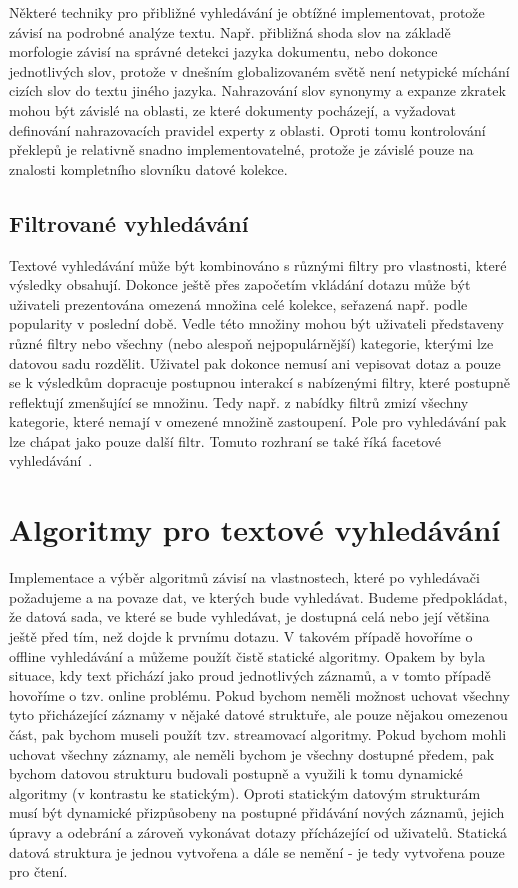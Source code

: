 \documentclass[11pt,letterpaper,oneside,openright]{book}
\begin{document}
Některé techniky pro přibližné vyhledávání je obtížné implementovat, protože
závisí na podrobné analýze textu. Např. přibližná shoda slov na základě
morfologie závisí na správné detekci jazyka dokumentu, nebo dokonce
jednotlivých slov, protože v dnešním globalizovaném světě není netypické
míchání cizích slov do textu jiného jazyka.  Nahrazování slov synonymy a
expanze zkratek mohou být závislé na oblasti, ze které dokumenty pocházejí, a
vyžadovat definování nahrazovacích pravidel experty z oblasti. Oproti tomu
kontrolování překlepů je relativně snadno implementovatelné, protože je závislé
pouze na znalosti kompletního slovníku datové kolekce.

\subsection{Filtrované vyhledávání} \label{sec:faceted_search}
Textové vyhledávání může být kombinováno s různými filtry pro vlastnosti, které
výsledky obsahují. Dokonce ještě přes započetím vkládání dotazu může být
uživateli prezentována omezená množina celé kolekce, seřazená např. podle
popularity v poslední době. Vedle této množiny mohou být uživateli představeny
různé filtry nebo všechny (nebo alespoň nejpopulárnější) kategorie, kterými lze
datovou sadu rozdělit. Uživatel pak dokonce nemusí ani vepisovat dotaz a pouze
se k výsledkům dopracuje postupnou interakcí s nabízenými filtry, které
postupně reflektují zmenšující se množinu. Tedy např. z nabídky filtrů zmizí
všechny kategorie, které nemají v omezené množině zastoupení. Pole pro
vyhledávání pak lze chápat jako pouze další filtr. Tomuto rozhraní se také říká
facetové vyhledávání~\cite{tunkelang2009faceted}.


\newpage
\section{Algoritmy pro textové vyhledávání}
Implementace a výběr algoritmů závisí na vlastnostech, které po vyhledávači
požadujeme a na povaze dat, ve kterých bude vyhledávat. Budeme předpokládat, že
datová sada, ve které se bude vyhledávat, je dostupná celá nebo její většina
ještě před tím, než dojde k prvnímu dotazu. V takovém případě hovoříme o
offline vyhledávání a můžeme použít čistě statické algoritmy.  Opakem by byla
situace, kdy text přichází jako proud jednotlivých záznamů, a v tomto případě
hovoříme o tzv. online problému. Pokud bychom neměli možnost uchovat všechny
tyto přicházející záznamy v nějaké datové struktuře, ale pouze nějakou omezenou
část, pak bychom museli použít tzv. streamovací algoritmy. Pokud bychom mohli
uchovat všechny záznamy, ale neměli bychom je všechny dostupné předem, pak
bychom datovou strukturu budovali postupně a využili k tomu dynamické algoritmy
(v kontrastu ke statickým). Oproti statickým datovým strukturám musí být
dynamické přizpůsobeny na postupné přidávání nových záznamů, jejich úpravy a
odebrání a zároveň vykonávat dotazy přícházející od uživatelů. Statická datová
struktura je jednou vytvořena a dále se nemění - je tedy vytvořena pouze pro
čtení.
\end{document}
